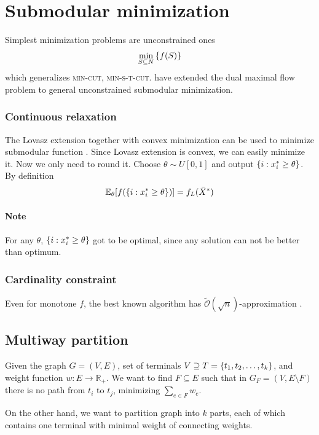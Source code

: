 \section{Submodular minimization}
Simplest minimization problems are unconstrained ones
\begin{align}
\min\limits_{S\subseteq N} \qty{f(S)}
\end{align}
which generalizes \textsc{min-cut}, \textsc{min-s-t-cut}. \citet{iwata2001combinatorial} have extended the dual maximal flow problem to general unconstrained submodular minimization.

\subsubsection{Continuous relaxation}
The Lovasz extension together with convex minimization can be used to minimize submodular function \cite{grotschel1981ellipsoid}. Since Lovasz extension is convex, we can easily minimize it. Now we only need to round it. Choose $\theta \sim U[0,1]$ and output $\qty{i: x^*_i \geq \theta}$. By definition
\begin{align}
\mathbb{E}_\theta \qty[f\qty(\qty{i: x^*_i \geq \theta})] = f_L(\bar{X}^*)
\end{align}
\paragraph{Note}
For any $\theta$, $\qty{i: x^*_i \geq \theta}$ got to be optimal, since any solution can not be better than optimum.
\subsubsection{Cardinality constraint}
Even for monotone $f$, the best known algorithm has $\tilde{\mathcal{O}}(\sqrt{n})$-approximation \cite{svitkina2011submodular}.

\subsection{Multiway partition}
Given  the graph $G=(V,E)$, set of terminals $V\supseteq T = \qty{t_1, t_2, \dots, t_k}$, and weight function $w: E\to \mathbb{R}_+$. We want to find $F\subseteq E$ such that in $G_F = (V, E\setminus F)$ there is no path from $t_i$ to $t_j$, minimizing $\sum_{e\in F} w_e$.

On the other hand, we want to partition graph into $k$ parts, each of which contains one terminal with minimal weight of connecting weights.


